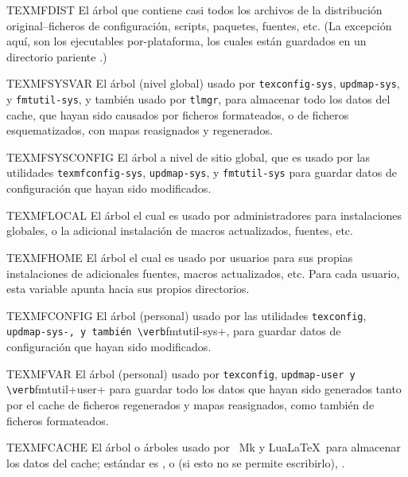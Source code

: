\documentclass{article}
\begin{document}
\begin{ttdescription}
\item [TEXMFDIST] El árbol que contiene casi todos los archivos de la distribución original--ficheros de configuración, scripts, paquetes, fuentes, etc. (La excepción aquí, son los ejecutables por-plataforma, los cuales están guardados en un directorio pariente .)
\item [TEXMFSYSVAR] El árbol (nivel global) usado por \verb+texconfig-sys+, \verb+updmap-sys+, y \verb+fmtutil-sys+, y también usado por \verb+tlmgr+, para almacenar todo los datos del cache, que hayan sido causados por ficheros formateados, o de ficheros esquematizados, con mapas reasignados y regenerados.
\item [TEXMFSYSCONFIG] El árbol a nivel de sitio global, que es usado por las utilidades \verb+texmfconfig-sys+, \verb+updmap-sys+, y \verb+fmtutil-sys+ para guardar datos de configuración que hayan sido modificados.
\item [TEXMFLOCAL] El árbol el cual es usado por administradores para instalaciones globales, o la adicional instalación de macros actualizados, fuentes, etc.
\item [TEXMFHOME] El árbol el cual es usado por usuarios para sus propias instalaciones de adicionales fuentes, macros actualizados, etc. Para cada usuario, esta variable apunta hacia sus propios directorios.
\item [TEXMFCONFIG] El árbol (personal) usado por las utilidades \verb+texconfig+, \verb+updmap-sys-, y también \verb+fmtutil-sys+, para guardar datos de configuración que hayan sido modificados.  
\item [TEXMFVAR] El árbol (personal) usado por \verb+texconfig+, \verb+updmap-user y \verb+fmtutil+user+ para guardar todo los datos que hayan sido generados tanto por el cache de ficheros regenerados y mapas reasignados, como también de ficheros formateados.
\item [TEXMFCACHE] El árbol o árboles usado por \ConTeXt\ Mk y Lua\LaTeX\ para almacenar los datos del cache; estándar es , o (si esto no se permite escribirlo), .
\end{ttdescription}
\end{document}
